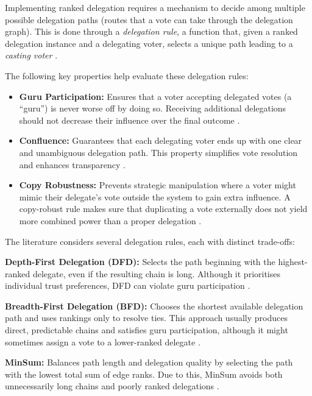 Implementing ranked delegation requires a mechanism to decide among multiple possible delegation paths (routes that a vote can take through the delegation graph).
This is done through a \textit{delegation rule}, a function that, given a ranked delegation instance and a delegating voter, selects a unique path leading to a \textit{casting voter} \citep{brill_liquid_2022}.

The following key properties help evaluate these delegation rules:

\begin{itemize}
  \item \textbf{Guru Participation:} Ensures that a voter accepting delegated votes (a ``guru'') is never worse off by doing so. Receiving additional delegations should not decrease their influence over the final outcome \citep{kotsialou_riley_2020}. 
  \item \textbf{Confluence:} Guarantees that each delegating voter ends up with one clear and unambiguous delegation path. This property simplifies vote resolution and enhances transparency \citep{brill_liquid_2022}. 
  \item \textbf{Copy Robustness:} Prevents strategic manipulation where a voter might mimic their delegate's vote outside the system to gain extra influence. A copy-robust rule makes sure that duplicating a vote externally does not yield more combined power than a proper delegation \citep{brill_liquid_2022,behrens_2015}. 
\end{itemize}

The literature considers several delegation rules, each with distinct trade-offs:

\textbf{Depth-First Delegation (DFD):} Selects the path beginning with the highest-ranked delegate, even if the resulting chain is long. Although it prioritises individual trust preferences, DFD can violate guru participation \citep{kotsialou_riley_2020}.

\textbf{Breadth-First Delegation (BFD):} Chooses the shortest available delegation path and uses rankings only to resolve ties. This approach usually produces direct, predictable chains and satisfies guru participation, although it might sometimes assign a vote to a lower-ranked delegate \citep{kotsialou_riley_2020, brill_liquid_2022}.

\textbf{MinSum:} Balances path length and delegation quality by selecting the path with the lowest total sum of edge ranks. Due to this, MinSum avoids both unnecessarily long chains and poorly ranked delegations \citep{brill_liquid_2022}.

